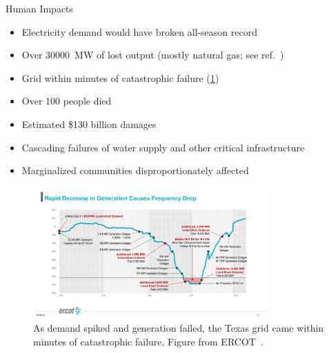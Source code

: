 \begin{block}{Human Impacts}
    \begin{itemize}
        \item Electricity demand would have broken all-season record \cite{ercotpublic_outagesv1:2021}
        \item Over \SI{30000}{\mega\watt} of lost output (mostly natural gas; see ref.~\cite{ercotpublic_outagesv2:2021})
        \item Grid within minutes of catastrophic failure (\cref{fig:ercot-frequency})
        \item Over 100 people died \cite{mulcahy_urideath:2021}
        \item Estimated \$130 billion damages \cite{busby_cascadingrisks:2021}
        \item Cascading failures of water supply and other critical infrastructure
        \item Marginalized communities disproportionately affected \cite{dobbins_blackoutdisparity:2021}
    \end{itemize}
    \begin{framed}
        \begin{figure}
            \centering
            \includegraphics[width=0.8\textwidth]{magness_frequency.pdf}
            \caption{
                As demand spiked and generation failed, the Texas grid came within minutes of catastrophic failure.
                Figure from ERCOT~\cite{magness_review:2021}.
            }
            \label{fig:ercot-frequency}
        \end{figure}
    \end{framed}
\end{block}